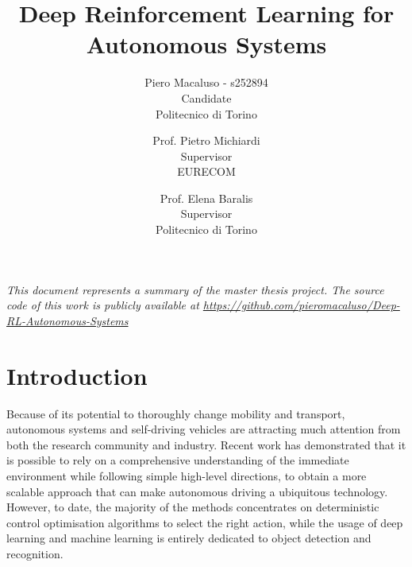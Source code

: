 \documentclass[10pt,twocolumn,letterpaper]{article}
\begin{document}
\title{Deep Reinforcement Learning for Autonomous Systems}

\author{Piero Macaluso - s252894\\
    Candidate\\
    Politecnico di Torino\\
    \and
    Prof. Pietro Michiardi\\
    Supervisor\\
    EURECOM\\
    \and
    Prof. Elena Baralis\\
    Supervisor\\
    Politecnico di Torino\\
}

\maketitle


\textit{This document represents a summary of the master thesis project.
The source code of this work is publicly available at \url{https://github.com/pieromacaluso/Deep-RL-Autonomous-Systems}}
\section{Introduction}

Because of its potential to thoroughly change mobility and transport, autonomous systems and self-driving vehicles are attracting much attention from both the research community and industry.
Recent work has demonstrated that it is possible to rely on a comprehensive understanding of the immediate environment while following simple high-level directions, to obtain a more scalable approach that can make autonomous driving a ubiquitous technology.
However, to date, the majority of the methods concentrates on deterministic control optimisation algorithms to select the right action, while the usage of deep learning and machine learning is entirely dedicated to object detection and recognition.
\end{document}
